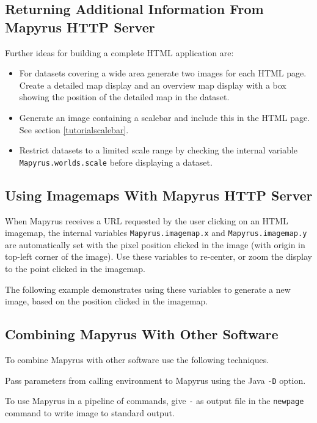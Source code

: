 \subsection{Returning Additional Information From Mapyrus HTTP Server}

Further ideas for building a complete HTML application are:

\begin{itemize}
\item
For datasets covering a wide area generate two images for
each HTML page.  Create a detailed map display and an overview map display
with a box showing the position of the detailed map in the dataset.

\item
Generate an image containing a scalebar
and include this in the HTML page.  See section \ref{tutorialscalebar}.

\item
Restrict datasets to a limited scale range by checking the
internal variable
\texttt{Mapyrus.worlds.scale} before displaying a dataset.
\end{itemize}

\subsection{Using Imagemaps With Mapyrus HTTP Server}

When Mapyrus receives a URL requested by the user
clicking on an HTML imagemap, the
internal variables
\texttt{Mapyrus.imagemap.x} and
\texttt{Mapyrus.imagemap.y} are automatically set with the pixel position
clicked in the image (with origin in top-left corner of the image).
Use these variables to re-center, or zoom the display to the
point clicked in the imagemap.

The following example demonstrates
using these variables to generate a new image, based on the
position clicked in the imagemap.



\subsection{Combining Mapyrus With Other Software}

To combine Mapyrus with other software use the following
techniques.

Pass parameters from calling environment to Mapyrus using the Java
\texttt{-D} option.

To use Mapyrus in a pipeline of commands,
give \texttt{-} as output file in the
\texttt{newpage}
command to write image to standard output.

